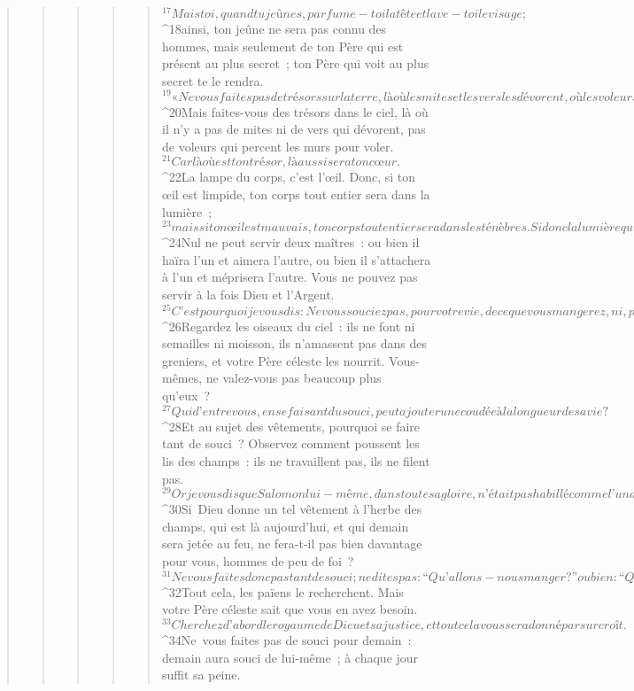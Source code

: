 \begin{verse}
\begin{verse}
\begin{verse}
\begin{verse}
\begin{verse}
${}^{17}Mais toi, quand tu jeûnes, parfume-toi la tête et lave-toi le visage ; 
${}^{18}ainsi, ton jeûne ne sera pas connu des hommes, mais seulement de ton Père qui est présent au plus secret ; ton Père qui voit au plus secret te le rendra.
${}^{19}« Ne vous faites pas de trésors sur la terre, là où les mites et les vers les dévorent, où les voleurs percent les murs pour voler. 
${}^{20}Mais faites-vous des trésors dans le ciel, là où il n’y a pas de mites ni de vers qui dévorent, pas de voleurs qui percent les murs pour voler. 
${}^{21}Car là où est ton trésor, là aussi sera ton cœur.
${}^{22}La lampe du corps, c’est l’œil. Donc, si ton œil est limpide, ton corps tout entier sera dans la lumière ; 
${}^{23}mais si ton œil est mauvais, ton corps tout entier sera dans les ténèbres. Si donc la lumière qui est en toi est ténèbres, comme elles seront grandes, les ténèbres !
${}^{24}Nul ne peut servir deux maîtres : ou bien il haïra l’un et aimera l’autre, ou bien il s’attachera à l’un et méprisera l’autre. Vous ne pouvez pas servir à la fois Dieu et l’Argent.
${}^{25}C’est pourquoi je vous dis : Ne vous souciez pas, pour votre vie, de ce que vous mangerez, ni, pour votre corps, de quoi vous le vêtirez. La vie ne vaut-elle pas plus que la nourriture, et le corps plus que les vêtements ? 
${}^{26}Regardez les oiseaux du ciel : ils ne font ni semailles ni moisson, ils n’amassent pas dans des greniers, et votre Père céleste les nourrit. Vous-mêmes, ne valez-vous pas beaucoup plus qu’eux ? 
${}^{27}Qui d’entre vous, en se faisant du souci, peut ajouter une coudée à la longueur de sa vie ?
${}^{28}Et au sujet des vêtements, pourquoi se faire tant de souci ? Observez comment poussent les lis des champs : ils ne travaillent pas, ils ne filent pas. 
${}^{29}Or je vous dis que Salomon lui-même, dans toute sa gloire, n’était pas habillé comme l’un d’entre eux. 
${}^{30}Si Dieu donne un tel vêtement à l’herbe des champs, qui est là aujourd’hui, et qui demain sera jetée au feu, ne fera-t-il pas bien davantage pour vous, hommes de peu de foi ?
${}^{31}Ne vous faites donc pas tant de souci ; ne dites pas : “Qu’allons-nous manger ?” ou bien : “Qu’allons-nous boire ?” ou encore : “Avec quoi nous habiller ?” 
${}^{32}Tout cela, les païens le recherchent. Mais votre Père céleste sait que vous en avez besoin. 
${}^{33}Cherchez d’abord le royaume de Dieu et sa justice, et tout cela vous sera donné par surcroît. 
${}^{34}Ne vous faites pas de souci pour demain : demain aura souci de lui-même ; à chaque jour suffit sa peine.
      

\end{verse}
\end{verse}
\end{verse}
\end{verse}
\end{verse}
